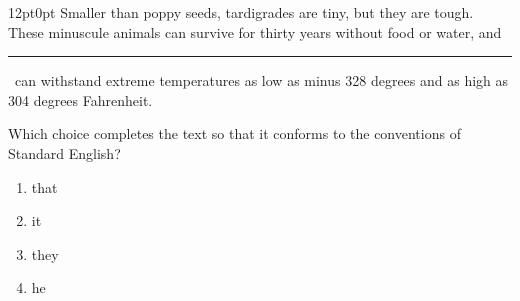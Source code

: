 \documentclass[11pt, twocolumn]{article}
\newcounter{questionnum}
\begin{document}
\vspace{6pt}\noindent
\begin{minipage}{\columnwidth}\raggedright
\noindent{}\par\vspace{8pt}
\begin{adjustwidth}{12pt}{0pt}
Smaller than poppy seeds, tardigrades are tiny, but they are tough. These minuscule animals can survive for thirty years without food or water, and \,\rule{2cm}{0.4pt}\, can withstand extreme temperatures as low as minus 328 degrees and as high as 304 degrees Fahrenheit.
\vspace{6pt}

Which choice completes the text so that it conforms to the conventions of Standard English?
\begin{enumerate}[label=\Alph*),leftmargin=18pt,topsep=3pt,itemsep=2pt]
  \item that
  \item it
  \item they
  \item he
\end{enumerate}
\end{adjustwidth}
\end{minipage}\par
\end{document}
